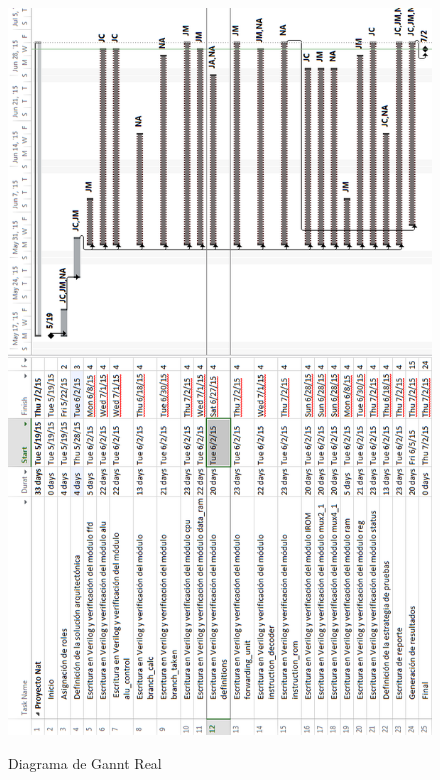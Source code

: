 \begin{figure}[hbtp]
\caption{Diagrama de Gannt Real}
\centering
\includegraphics[scale=0.6]{imagenes/real.PNG}
\label{f:gannt_real}
\end{figure}

